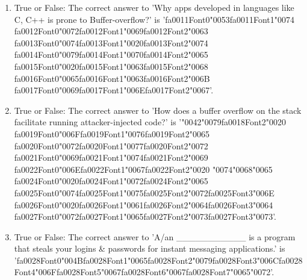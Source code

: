 \documentclass[12pt]{article}
\begin{document}
\begin{enumerate}[label=\arabic*.]
\item True or False: The correct answer to 'Why apps developed in languages like C, C++ is prone to Buffer-overflow?' is '{\csname fa0011Font0\endcsname\char"0053}{\csname fa0011Font1\endcsname\char"0074} {\csname fa0012Font0\endcsname\char"0072}{\csname fa0012Font1\endcsname\char"0069}{\csname fa0012Font2\endcsname\char"0063} {\csname fa0013Font0\endcsname\char"0074}{\csname fa0013Font1\endcsname\char"0020}{\csname fa0013Font2\endcsname\char"0074} {\csname fa0014Font0\endcsname\char"0079}{\csname fa0014Font1\endcsname\char"0070}{\csname fa0014Font2\endcsname\char"0065} {\csname fa0015Font0\endcsname\char"0020}{\csname fa0015Font1\endcsname\char"0063}{\csname fa0015Font2\endcsname\char"0068} {\csname fa0016Font0\endcsname\char"0065}{\csname fa0016Font1\endcsname\char"0063}{\csname fa0016Font2\endcsname\char"006B} {\csname fa0017Font0\endcsname\char"0069}{\csname fa0017Font1\endcsname\char"006E}{\csname fa0017Font2\endcsname\char"0067}'.
\item True or False: The correct answer to 'How does a buffer overflow on the stack facilitate running attacker-injected code?' is '{\char"0042}{\char"0079}{\csname fa0018Font2\endcsname\char"0020} {\csname fa0019Font0\endcsname\char"006F}{\csname fa0019Font1\endcsname\char"0076}{\csname fa0019Font2\endcsname\char"0065} {\csname fa0020Font0\endcsname\char"0072}{\csname fa0020Font1\endcsname\char"0077}{\csname fa0020Font2\endcsname\char"0072} {\csname fa0021Font0\endcsname\char"0069}{\csname fa0021Font1\endcsname\char"0074}{\csname fa0021Font2\endcsname\char"0069} {\csname fa0022Font0\endcsname\char"006E}{\csname fa0022Font1\endcsname\char"0067}{\csname fa0022Font2\endcsname\char"0020} {\char"0074}{\char"0068}{\char"0065} {\csname fa0024Font0\endcsname\char"0020}{\csname fa0024Font1\endcsname\char"0072}{\csname fa0024Font2\endcsname\char"0065} {\csname fa0025Font0\endcsname\char"0074}{\csname fa0025Font1\endcsname\char"0075}{\csname fa0025Font2\endcsname\char"0072}{\csname fa0025Font3\endcsname\char"006E} {\csname fa0026Font0\endcsname\char"0020}{\csname fa0026Font1\endcsname\char"0061}{\csname fa0026Font2\endcsname\char"0064}{\csname fa0026Font3\endcsname\char"0064} {\csname fa0027Font0\endcsname\char"0072}{\csname fa0027Font1\endcsname\char"0065}{\csname fa0027Font2\endcsname\char"0073}{\csname fa0027Font3\endcsname\char"0073}'.
\item True or False: The correct answer to 'A/an \_\_\_\_\_\_\_\_\_\_\_ is a program that steals your logins \& passwords for instant messaging applications.' is '{\csname fa0028Font0\endcsname\char"004B}{\csname fa0028Font1\endcsname\char"0065}{\csname fa0028Font2\endcsname\char"0079}{\csname fa0028Font3\endcsname\char"006C}{\csname fa0028Font4\endcsname\char"006F}{\csname fa0028Font5\endcsname\char"0067}{\csname fa0028Font6\endcsname\char"0067}{\csname fa0028Font7\endcsname\char"0065}{\char"0072}'.

\end{enumerate}
\end{document}
